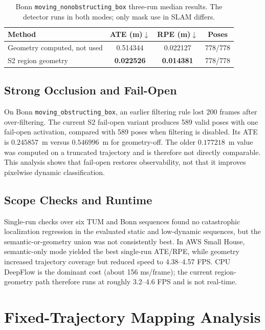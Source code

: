 \documentclass[10pt]{article}
\begin{document}
\begin{table}[t]
\centering
\caption{Bonn \texttt{moving\_nonobstructing\_box} three-run median results. The detector runs in both modes; only mask use in SLAM differs.}
\label{tab:bonn}
\begin{tabular}{lccc}
\toprule
Method & ATE (m)$\downarrow$ & RPE (m)$\downarrow$ & Poses\\
\midrule
Geometry computed, not used & 0.514344 & 0.022127 & 778/778\\
S2 region geometry & \textbf{0.022526} & \textbf{0.014381} & 778/778\\
\bottomrule
\end{tabular}
\end{table}

\subsection{Strong Occlusion and Fail-Open}

On Bonn \texttt{moving\_obstructing\_box}, an earlier filtering rule lost 200 frames after over-filtering. The current S2 fail-open variant produces 589 valid poses with one fail-open activation, compared with 589 poses when filtering is disabled. Its ATE is $0.245857$~m versus $0.546996$~m for geometry-off. The older $0.177218$~m value was computed on a truncated trajectory and is therefore not directly comparable. This analysis shows that fail-open restores observability, not that it improves pixelwise dynamic classification.

\subsection{Scope Checks and Runtime}

Single-run checks over six TUM and Bonn sequences found no catastrophic localization regression in the evaluated static and low-dynamic sequences, but the semantic-or-geometry union was not consistently best. In AWS Small House, semantic-only mode yielded the best single-run ATE/RPE, while geometry increased trajectory coverage but reduced speed to 4.38--4.57 FPS. CPU DeepFlow is the dominant cost (about 156 ms/frame); the current region-geometry path therefore runs at roughly 3.2--4.6 FPS and is not real-time.

\section{Fixed-Trajectory Mapping Analysis}
\end{document}
